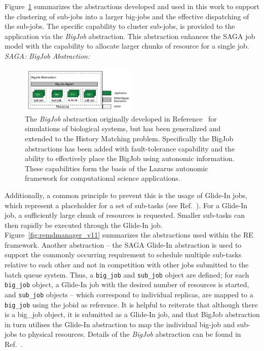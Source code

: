 \documentclass[conference,final]{IEEEtran}
\begin{document}
Figure~\ref{fig:abstractions} summarizes the abstractions developed
and used in this work to support the clustering of sub-jobs into a
larger big-jobs and the effective dispatching of the sub-jobs.  The
specific capability to cluster sub-jobs, is provided to the
application via the \emph{BigJob} abstraction. This abstraction
enhances the SAGA job model with the capability to allocate larger
chunks of resource for a single job.
{\it SAGA: BigJob Abstraction:}
\begin{figure}[t]
      \centering
      \includegraphics[width=0.50\textwidth]{./figures/enkf_bigjob.pdf}
      \caption{\footnotesize The {\it BigJob} abstraction originally
        developed in Reference~\cite{saga_royalsoc} for simulations of
        biological systems, but has been generalized and extended to
        the History Matching problem. Specifically the BigJob
        abstractions has been added with fault-tolerance capability
        and the ability to effectively place the BigJob using
        autonomic information. These capabilities form the basis of
        the Lazarus autonomic framework for computational science
        applications.}
      \label{fig:abstractions}
\end{figure}
Additionally, a common principle to prevent this is the usage of
Glide-In jobs, which represent a placeholder for a set of sub-tasks
(see Ref.~\cite{citeulike:291860}).  For a Glide-In job, a
sufficiently large chunk of resources is requested. Smaller sub-tasks
can then rapidly be executed through the Glide-In job.
Figure~\ref{fig:remdmanager_v11} summarizes the abstractions used
within the RE framework.  Another abstraction -- the SAGA Glide-In
abstraction is used to support the commonly occurring requirement to
schedule multiple sub-tasks relative to each other and not in
competition with other jobs submitted to the batch queue system.
Thus, a \texttt{big\_job} and \texttt{sub\_job} object are defined;
for each \texttt{big\_job} object, a Glide-In job with the desired
number of resources is started, and \texttt{sub\_job} objects -- which
correspond to individual replicas, are mapped to a \texttt{big\_job}
using the jobid as reference. It is helpful to reiterate that although
there is a big\_job object, it is submitted as a Glide-In job, and
that BigJob abstraction in turn utilises the Glide-In abstraction to
map the individual big-job and sub-jobs to physical resources.
Details of the \emph{BigJob} abstraction can be found in
Ref.~\cite{saga_royalsoc}.
\end{document}
